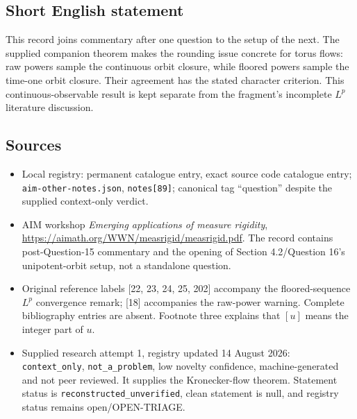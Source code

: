 \documentclass[11pt]{article}
\begin{document}
\subsection{Short English statement}
This record joins commentary after one question to the setup of the next. The supplied companion theorem makes the rounding issue concrete for torus flows: raw powers sample the continuous orbit closure, while floored powers sample the time-one orbit closure. Their agreement has the stated character criterion. This continuous-observable result is kept separate from the fragment's incomplete $L^p$ literature discussion.
\subsection{Sources}
\begin{itemize}
\item Local registry: permanent catalogue entry, exact source code catalogue entry; \texttt{aim-other-notes.json}, \texttt{notes[89]}; canonical tag ``question'' despite the supplied context-only verdict.
\item AIM workshop \emph{Emerging applications of measure rigidity}, \url{https://aimath.org/WWN/measrigid/measrigid.pdf}. The record contains post-Question-15 commentary and the opening of Section 4.2/Question 16's unipotent-orbit setup, not a standalone question.
\item Original reference labels [22, 23, 24, 25, 202] accompany the floored-sequence $L^p$ convergence remark; [18] accompanies the raw-power warning. Complete bibliography entries are absent. Footnote three explains that $[u]$ means the integer part of $u$.
\item Supplied research attempt 1, registry updated 14 August 2026: \texttt{context\_only}, \texttt{not\_a\_problem}, low novelty confidence, machine-generated and not peer reviewed. It supplies the Kronecker-flow theorem. Statement status is \texttt{reconstructed\_unverified}, clean statement is null, and registry status remains open/OPEN-TRIAGE.
\end{itemize}
\end{document}
